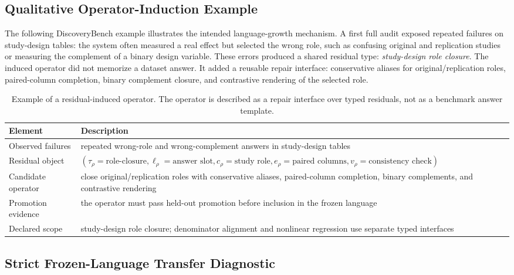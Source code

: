 \documentclass[letterpaper]{article}
\newcommand{\tblhdr}{\rowcolor{headerrow}}
\begin{document}
\subsection*{Qualitative Operator-Induction Example}

The following DiscoveryBench example illustrates the intended language-growth
mechanism. A first full audit exposed repeated failures on study-design tables:
the system often measured a real effect but selected the wrong role, such as
confusing original and replication studies or measuring the complement of a
binary design variable. These errors produced a shared residual type:
\emph{study-design role closure}. The induced operator did not memorize a
dataset answer. It added a reusable repair interface: conservative aliases for
original/replication roles, paired-column completion, binary complement
closure, and contrastive rendering of the selected role.

\begin{table}[!htbp]
\centering
\small
\begin{tabularx}{0.96\textwidth}{|l|Y|}
\hline
\tblhdr
Element & Description \\
\hline
Observed failures & repeated wrong-role and wrong-complement answers in study-design tables \\
\hline
Residual object & $(\tau_\rho=\text{role-closure},\ell_\rho=\text{answer slot},c_\rho=\text{study role},e_\rho=\text{paired columns},v_\rho=\text{consistency check})$ \\
\hline
Candidate operator & close original/replication roles with conservative aliases, paired-column completion, binary complements, and contrastive rendering \\
\hline
Promotion evidence & the operator must pass held-out promotion before inclusion in the frozen language \\
\hline
Declared scope & study-design role closure; denominator alignment and nonlinear regression use separate typed interfaces \\
\hline
\end{tabularx}
\caption{Example of a residual-induced operator. The operator is described as a
repair interface over typed residuals, not as a benchmark answer template.}
\label{tab:operator_example}
\end{table}

\subsection*{Strict Frozen-Language Transfer Diagnostic}
\end{document}
